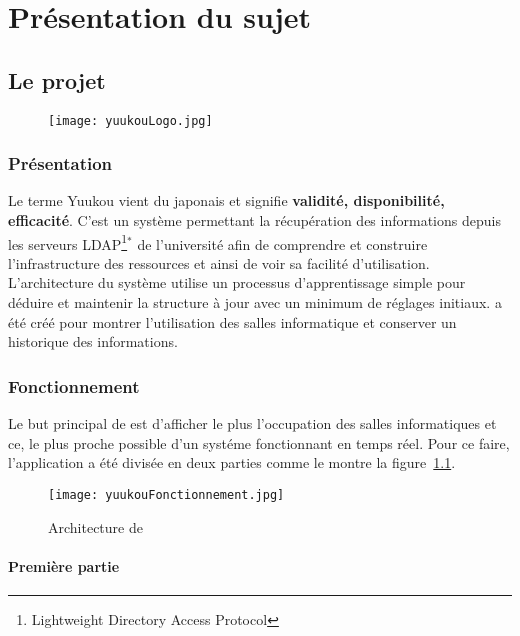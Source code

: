 \chapter{Pr\'esentation du sujet}

\section{Le projet \Yuukou}

\begin{figure}[!ht]
	\centering
	\texttt{[image: yuukouLogo.jpg]}

\end{figure}

\subsection{Pr\'esentation}

Le terme Yuukou vient du japonais \Yuukou{} et signifie \textbf{validit\'e, disponibilit\'e, efficacit\'e}. 
C'est un syst\`eme permettant la r\'ecup\'eration des informations depuis les serveurs LDAP\protect\footnote{Lightweight Directory Access Protocol}$^*$ de l'universit\'e afin de comprendre et construire l'infrastructure des ressources et ainsi de voir sa facilit\'e d'utilisation. 
L'architecture du syst\`eme utilise un processus d'apprentissage simple pour d\'eduire et maintenir la structure \`a jour avec un minimum de r\'eglages initiaux.
\Yuukou{} a \'et\'e cr\'e\'e pour montrer l'utilisation des salles informatique et conserver un historique des informations.

\subsection{Fonctionnement}

Le but principal de \Yuukou{} est d'afficher le plus l'occupation des salles informatiques et ce, le plus proche possible d'un syst\'eme fonctionnant en temps r\'eel.
Pour ce faire, l'application a \'et\'e divis\'ee en deux parties  comme le montre la figure~\ref{yuukouFonctionnement}.

\clearpage

\begin{figure}[!ht]
	\centering
	\texttt{[image: yuukouFonctionnement.jpg]}
	\caption{Architecture de \Yuukou}
	\label{yuukouFonctionnement}

\end{figure}

\subsubsection{Premi\`ere partie}

